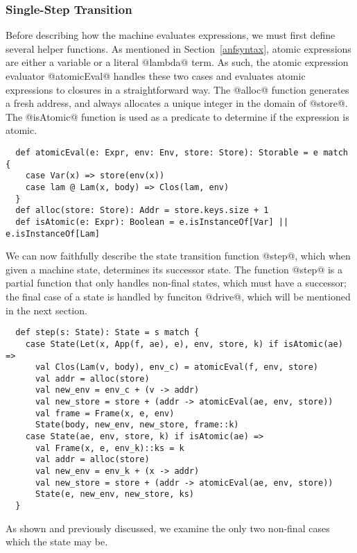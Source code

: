 \documentclass[acmsmall, review]{acmart}\settopmatter{}
\begin{document}
\subsubsection{Single-Step Transition}
Before describing how the machine evaluates expressions, we must first define several helper
functions. As mentioned in Section~\ref{anfsyntax}, atomic expressions are either a variable
or a literal @lambda@ term. As such, the atomic expression evaluator @atomicEval@ handles
these two cases and evaluates atomic expressions to closures in a straightforward way.
The @alloc@ function generates a fresh address, and always allocates a unique integer
in the domain of @store@.
The @isAtomic@ function is used as a predicate to determine if the expression is atomic.

\begin{lstlisting}
  def atomicEval(e: Expr, env: Env, store: Store): Storable = e match {
    case Var(x) => store(env(x))
    case lam @ Lam(x, body) => Clos(lam, env)
  }
  def alloc(store: Store): Addr = store.keys.size + 1
  def isAtomic(e: Expr): Boolean = e.isInstanceOf[Var] || e.isInstanceOf[Lam]
\end{lstlisting}

We can now faithfully describe the state transition function @step@,
which when given a machine state, determines its successor state.
The function @step@ is a partial function that only handles non-final states,
which must have a successor; the final case of a state is handled by funciton
@drive@, which will be mentioned in the next section.

\begin{lstlisting}
  def step(s: State): State = s match {
    case State(Let(x, App(f, ae), e), env, store, k) if isAtomic(ae) =>
      val Clos(Lam(v, body), env_c) = atomicEval(f, env, store)
      val addr = alloc(store)
      val new_env = env_c + (v -> addr)
      val new_store = store + (addr -> atomicEval(ae, env, store))
      val frame = Frame(x, e, env)
      State(body, new_env, new_store, frame::k)
    case State(ae, env, store, k) if isAtomic(ae) =>
      val Frame(x, e, env_k)::ks = k
      val addr = alloc(store)
      val new_env = env_k + (x -> addr)
      val new_store = store + (addr -> atomicEval(ae, env, store))
      State(e, new_env, new_store, ks)
  }
\end{lstlisting}

As shown and previously discussed, we examine the only two non-final cases which the state
may be.
\end{document}
